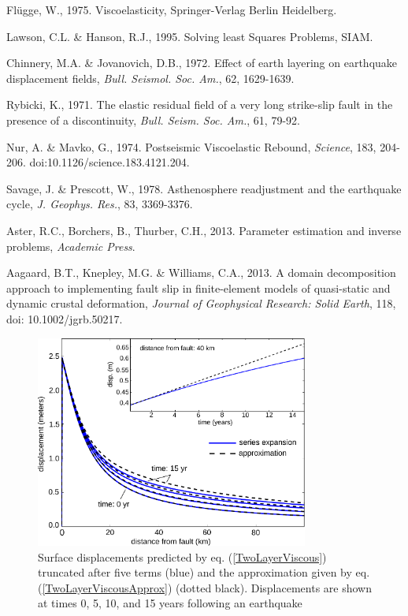 \documentclass[12pt]{article}
\begin{document}
\begin{thebibliography}{}
 Fl\"ugge,
  W., 1975. Viscoelasticity, Springer-Verlag Berlin Heidelberg.

 Lawson, C.L. \&
  Hanson, R.J., 1995. Solving least Squares Problems, SIAM.

 Chinnery,
  M.A. \& Jovanovich, D.B., 1972. Effect of earth layering on
  earthquake displacement fields, \textit{Bull. Seismol.  Soc. Am.},
  62, 1629-1639.

 Rybicki, K., 1971. The elastic
  residual field of a very long strike-slip fault in the presence of a
  discontinuity, \textit{Bull. Seism. Soc. Am.}, 61, 79-92.

 Nur, A. \& Mavko, G.,
  1974. Postseismic Viscoelastic Rebound, \textit{Science}, 183,
  204-206. doi:10.1126/science.183.4121.204.

 Savage, J. \&
  Prescott, W., 1978. Asthenosphere readjustment and the earthquake
  cycle, \textit{J. Geophys. Res.}, 83, 3369-3376.

 Aster, R.C., Borchers,
  B., Thurber, C.H., 2013. Parameter estimation and inverse problems,
  {\textit{Academic Press}}.

 Aagaard, B.T., Knepley,
  M.G. \& Williams, C.A., 2013. A domain decomposition approach to
  implementing fault slip in finite-element models of quasi-static and
  dynamic crustal deformation, \textit{Journal of Geophysical
    Research: Solid Earth}, 118, doi: 10.1002/jgrb.50217.

\end{thebibliography}

\begin{figure}[h!]\label{figure1}
  \centering
  \includegraphics[width=0.8\textwidth]{FinalFigures/Figure1.pdf}
  \caption{Surface displacements predicted by
    eq. (\ref{TwoLayerViscous}) truncated after five terms (blue) and
    the approximation given by eq. (\ref{TwoLayerViscousApprox})
    (dotted black).  Displacements are shown at times 0, 5, 10, and 15
    years following an earthquake}
  \label{figure 1}
\end{figure}
\end{document}
